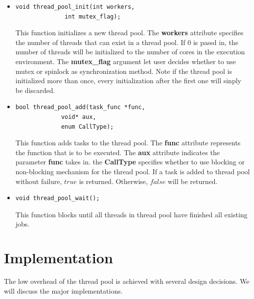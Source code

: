 \documentclass[journal, a4paper]{IEEEtran}
\begin{document}
\begin{itemize}
	\item \begin{lstlisting}
void thread_pool_init(int workers, 
		      int mutex_flag);
	\end{lstlisting}
	This function initializes a new thread pool. The \textbf{workers} attribute specifies the number of threads that can exist in a thread pool. If $0$ is passd in, the number of threads will be initialized to the number of cores in the execution environment. The \textbf{mutex\_flag} argument let user decides whether to use mutex or spinlock as synchronization method. Note if the thread pool is initialized more than once, every initialization after the first one will sinply be discarded.\\
	\item 
	\begin{lstlisting}
bool thread_pool_add(task_func *func,
		     void* aux,
		     enum CallType);
	\end{lstlisting}
	This function adds tasks to the thread pool. The \textbf{func} attribute represents the function that is to be executed. The \textbf{aux} attribute indicates the parameter \textbf{func} takes in. the \textbf{CallType} specifies whether to use blocking or non-blocking mechanism for the thread pool. If a task is added to thread pool without failure, $true$ is returned. Otherwise, $false$ will be returned.\\
	\item \begin{lstlisting}
void thread_pool_wait();
	\end{lstlisting}
	This function blocks until all threads in thread pool have finished all existing jobs.
\end{itemize}

\section{Implementation}
The low overhead of the thread pool is achieved with several design decisions. We will discuss the major implementations. 
\end{document}
